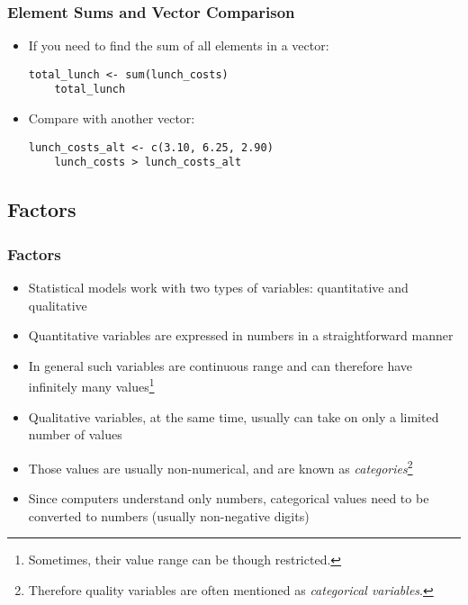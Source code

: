 \documentclass[10pt]{beamer}
\theoremstyle{definition}
\begin{document}
\begin{frame}[fragile]
\frametitle{Element Sums and Vector Comparison}
\begin{itemize}
	\item If you need to find the sum of all elements in a vector:
	\begin{lstlisting}[style = rstyle, breaklines]
	total_lunch <- sum(lunch_costs)
	total_lunch	
	\end{lstlisting}

	\item Compare with another vector:
	\begin{lstlisting}[style = rstyle, breaklines]
	lunch_costs_alt <- c(3.10, 6.25, 2.90)
	lunch_costs > lunch_costs_alt
	\end{lstlisting}
\end{itemize}
\end{frame}

\subsection{Factors}
\begin{frame}[fragile]
	\frametitle{Factors}
	\begin{itemize}
		\item Statistical models work with two types of variables: quantitative and qualitative
		
		\item Quantitative variables are expressed in numbers in a straightforward manner
		
		\item In general such variables are continuous range and can therefore have infinitely many values\footnote{Sometimes, their value range can be though restricted.}
		
		\item Qualitative variables, at the same time, usually can take on only a limited number of values
		
		\item Those values are usually non-numerical, and are known as \textit{categories}\footnote{Therefore quality variables are often mentioned as \textit{categorical variables}.}
		
		\item Since computers understand only numbers, categorical values need to be converted to numbers (usually non-negative digits)
	\end{itemize}
\end{frame}
\end{document}
